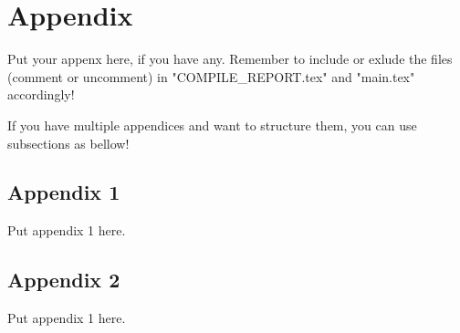 \section{Appendix} \label{sec:appendix}

Put your appenx here, if you have any. Remember to include or exlude the files (comment or uncomment) in "COMPILE\_REPORT.tex" and "main.tex" accordingly!

If you have multiple appendices and want to structure them, you can use subsections as bellow!

\subsection{Appendix 1}
Put appendix 1 here.

\subsection{Appendix 2}
Put appendix 1 here.
